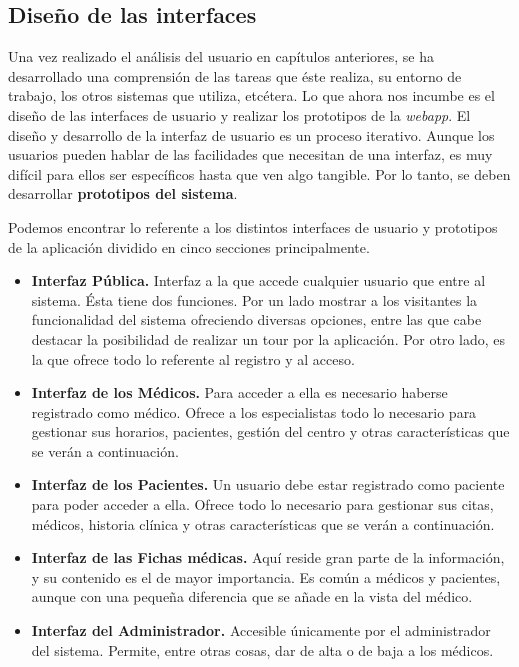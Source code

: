 	
	
	\subsection{Diseño de las interfaces} %
	\label{sec:iu_diseno}
	
	Una vez realizado el análisis del usuario en capítulos anteriores, se ha desarrollado una comprensión de las tareas que éste realiza, su entorno de trabajo, los otros sistemas que utiliza, etcétera. Lo que ahora nos incumbe es el diseño de las interfaces de usuario y realizar los prototipos de la \textit{webapp}. El diseño y desarrollo de la interfaz de usuario es un proceso iterativo. Aunque los usuarios pueden hablar de las facilidades que necesitan de una interfaz, es muy difícil para ellos ser específicos hasta que ven algo tangible. Por lo tanto, se deben desarrollar \textbf{prototipos del sistema}.
	
	Podemos encontrar lo referente a los distintos interfaces de usuario y prototipos de la aplicación dividido en cinco secciones principalmente.
	\begin{itemize}
	\item \textbf{Interfaz Pública.} Interfaz a la que accede cualquier usuario que entre al sistema. Ésta tiene dos funciones. Por un lado mostrar a los visitantes la funcionalidad del sistema ofreciendo diversas opciones, entre las que cabe destacar la posibilidad de realizar un tour por la aplicación. Por otro lado, es la que ofrece todo lo referente al registro y al acceso.
	\item \textbf{Interfaz de los Médicos.} Para acceder a ella es necesario haberse registrado como médico. Ofrece a los especialistas todo lo necesario para gestionar sus horarios, pacientes, gestión del centro y otras características que se verán a continuación.
	\item \textbf{Interfaz de los Pacientes.} Un usuario debe estar registrado como paciente para poder acceder a ella. Ofrece todo lo necesario para gestionar sus citas, médicos, historia clínica y otras características que se verán a continuación.
	\item \textbf{Interfaz de las Fichas médicas.} Aquí reside gran parte de la información, y su contenido es el de mayor importancia. Es común a médicos y pacientes, aunque con una pequeña diferencia que se añade en la vista del médico.
	\item \textbf{Interfaz del Administrador.} Accesible únicamente por el administrador del sistema. Permite, entre otras cosas, dar de alta o de baja a los médicos.
	\end{itemize}
	
